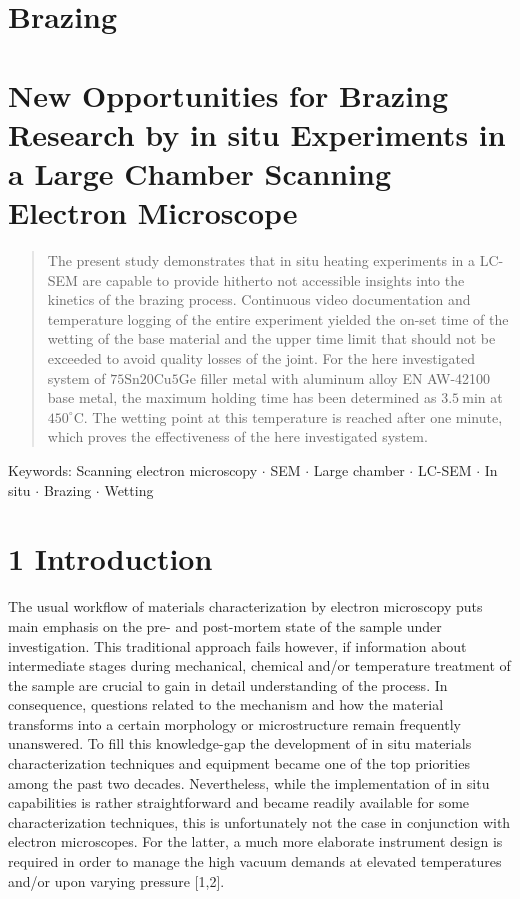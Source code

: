 \documentclass[10pt]{article}
\begin{document}
\section*{Brazing}
\section*{New Opportunities for Brazing Research by in situ Experiments in a Large Chamber Scanning Electron Microscope }


\begin{abstract}
The present study demonstrates that in situ heating experiments in a LC-SEM are capable to provide hitherto not accessible insights into the kinetics of the brazing process. Continuous video documentation and temperature logging of the entire experiment yielded the on-set time of the wetting of the base material and the upper time limit that should not be exceeded to avoid quality losses of the joint. For the here investigated system of $75 \mathrm{Sn} 20 \mathrm{Cu} 5 \mathrm{Ge}$ filler metal with aluminum alloy EN AW-42100 base metal, the maximum holding time has been determined as $3.5 \mathrm{~min}$ at $450^{\circ} \mathrm{C}$. The wetting point at this temperature is reached after one minute, which proves the effectiveness of the here investigated system.
\end{abstract}

Keywords: Scanning electron microscopy $\cdot$ SEM $\cdot$ Large chamber $\cdot$ LC-SEM $\cdot$ In situ $\cdot$ Brazing $\cdot$ Wetting

\section*{1 Introduction}
The usual workflow of materials characterization by electron microscopy puts main emphasis on the pre- and post-mortem state of the sample under investigation. This traditional approach fails however, if information about intermediate stages during mechanical, chemical and/or temperature treatment of the sample are crucial to gain in detail understanding of the process. In consequence, questions related to the mechanism and how the material transforms into a certain morphology or microstructure remain frequently unanswered. To fill this knowledge-gap the development of in situ materials characterization techniques and equipment became one of the top priorities among the past two decades. Nevertheless, while the implementation of in situ capabilities is rather straightforward and became readily available for some characterization techniques, this is unfortunately not the case in conjunction with electron microscopes. For the latter, a much more elaborate instrument design is required in order to manage the high vacuum demands at elevated temperatures and/or upon varying pressure [1,2].
\end{document}
